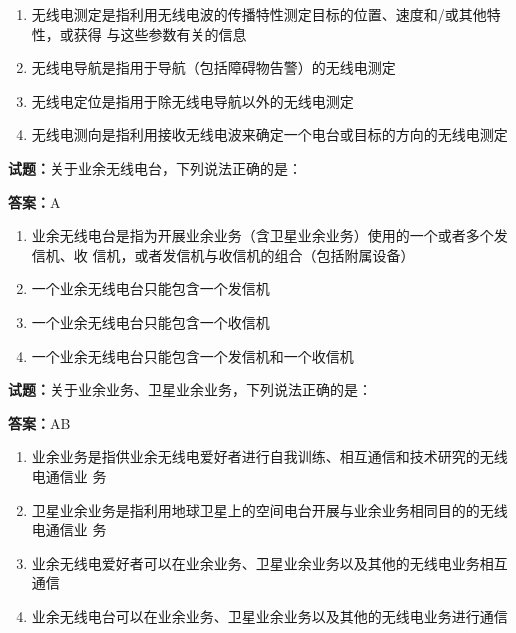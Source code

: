 \documentclass{ctexbook}
\begin{document}
\begin{enumerate}[leftmargin=3em]
  \item 无线电测定是指利用无线电波的传播特性测定目标的位置、速度和/或其他特性，或获得
与这些参数有关的信息 

  \item 无线电导航是指用于导航（包括障碍物告警）的无线电测定 

  \item 无线电定位是指用于除无线电导航以外的无线电测定 

  \item 无线电测向是指利用接收无线电波来确定一个电台或目标的方向的无线电测定 

\end{enumerate}





\vspace{1em}

\textbf{试题：}关于业余无线电台，下列说法正确的是： 

\textbf{答案：}A 

\begin{enumerate}[leftmargin=3em]
  \item 业余无线电台是指为开展业余业务（含卫星业余业务）使用的一个或者多个发信机、收
信机，或者发信机与收信机的组合（包括附属设备） 

  \item 一个业余无线电台只能包含一个发信机 


  \item 一个业余无线电台只能包含一个收信机 

  \item 一个业余无线电台只能包含一个发信机和一个收信机 

\end{enumerate}





\vspace{1em}

\textbf{试题：}关于业余业务、卫星业余业务，下列说法正确的是： 

\textbf{答案：}AB 

\begin{enumerate}[leftmargin=3em]
  \item 业余业务是指供业余无线电爱好者进行自我训练、相互通信和技术研究的无线电通信业
务 

  \item 卫星业余业务是指利用地球卫星上的空间电台开展与业余业务相同目的的无线电通信业
务 

  \item 业余无线电爱好者可以在业余业务、卫星业余业务以及其他的无线电业务相互通信 

  \item 业余无线电台可以在业余业务、卫星业余业务以及其他的无线电业务进行通信 

\end{enumerate}
\end{document}
